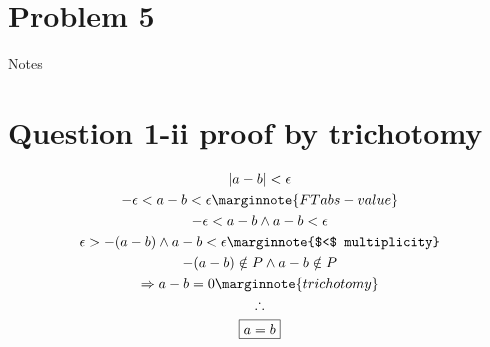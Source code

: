 \documentclass[letterpaper]{article}
\begin{document}
\section{Problem 5}

\pagebreak
\setcounter{section}{0}

\begin{center}\Large{Notes}\end{center}

\section{Question 1-ii proof by trichotomy}
\begin{gather*}
|a-b|<\epsilon \\
-\epsilon < a-b < \epsilon \marginnote{FT abs-value} \\
-\epsilon < a-b \land a-b < \epsilon \\
\epsilon > -(a-b) \land a-b < \epsilon \marginnote{$<$ multiplicity} \\
-(a-b) \notin P \land a-b \notin P \\
\Rightarrow a-b=0 \marginnote{trichotomy} \\
\therefore \\
\boxed{a = b}
\end{gather*}
\end{document}
